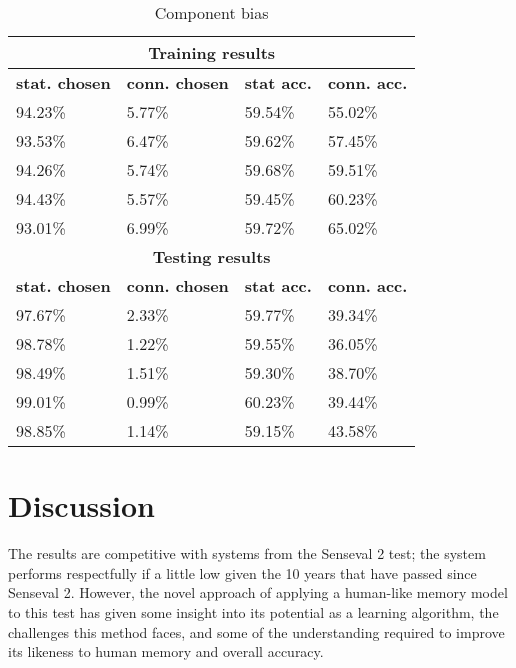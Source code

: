 \begin{table}[htpb]
	\centering 
	\begin{tabular}{|l|l|l|l|}
		\hline
		\multicolumn{4}{|c|}{\bf Training results } \\ \hline
		{\bf stat. chosen } & {\bf conn. chosen } & {\bf stat acc.} & {\bf conn. acc.}\\ \hline
		94.23\%             & 5.77\%              &  59.54\%        & 55.02\% \\ \hline
		93.53\%             & 6.47\%              &  59.62\%        & 57.45\% \\ \hline
		94.26\%             & 5.74\%              &  59.68\%        & 59.51\% \\ \hline
		94.43\%             & 5.57\%              &  59.45\%        & 60.23\% \\ \hline
		93.01\%             & 6.99\%              &  59.72\%        & 65.02\% \\ \hline
	    \multicolumn{4}{|c|}{\bf Testing results } \\ \hline
		{\bf stat. chosen } & {\bf conn. chosen } & {\bf stat acc.} & {\bf conn. acc.}\\ \hline
		97.67\%             & 2.33\%              &  59.77\%        & 39.34\% \\ \hline
		98.78\%             & 1.22\%              &  59.55\%        & 36.05\% \\ \hline
		98.49\%             & 1.51\%              &  59.30\%        & 38.70\% \\ \hline
		99.01\%             & 0.99\%              &  60.23\%        & 39.44\% \\ \hline
		98.85\%             & 1.14\%              &  59.15\%        & 43.58\% \\ \hline
	\end{tabular}
	\caption{Component bias \label{table:BIASNESS}}
\end{table}

\section{Discussion}

The results are competitive with systems from the Senseval 2 test; the system
performs respectfully if a little low given the 10 years that have passed since Senseval 2. 
However, the novel approach of applying a human-like memory model to this test
has given some insight into its potential as a learning algorithm, the
challenges this method faces, and some of the understanding required to improve
its likeness to human memory and overall accuracy.

